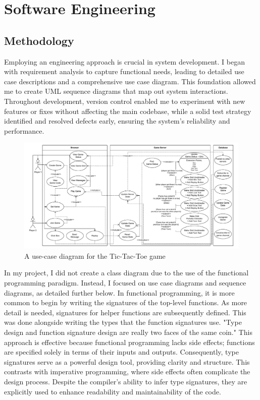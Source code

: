 \documentclass[]{project_interim}
\begin{document}
\chapter{Software Engineering}

\section{Methodology}
Employing an engineering approach is crucial in system development. I began with
requirement analysis to capture functional needs, leading to detailed use case
descriptions and a comprehensive use case diagram. This foundation allowed me to
create UML sequence diagrams that map out system interactions. Throughout development,
version control enabled me to experiment with new features or fixes without
affecting the main codebase, while a solid test strategy identified and resolved
defects early, ensuring the system's reliability and performance.

\begin{figure}[ht!]
  \centering
  \includegraphics[width=\linewidth]{use_case}
  \vspace*{-1.5cm}
  \caption{A use-case diagram for the Tic-Tac-Toe game}
  \label{fig: 2}
\end{figure}

In my project, I did not create a class diagram due to the use of the functional
programming paradigm. Instead, I focused on use case diagrams and sequence diagrams,
as detailed further below. In functional programming, it is more common to begin
by writing the signatures of the top-level functions. As more detail is needed,
signatures for helper functions are subsequently defined. \cite{Wlaschin_functional_2014}
This was done alongside writing the types that the function signatures use. "Type design and function
signature design are really two faces of the same coin."\cite{noauthor_chapter_2024}
This approach is effective because functional programming lacks side effects; functions are
specified solely in terms of their inputs and outputs. Consequently,
type signatures serve as a powerful design tool, providing clarity and structure.
This contrasts with imperative programming, where side effects often complicate
the design process. Despite the compiler's ability to infer type signatures,
they are explicitly used to enhance readability and maintainability of the code.
\end{document}
